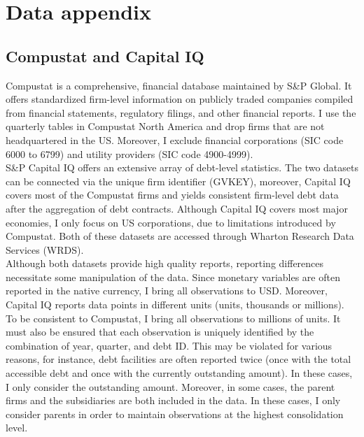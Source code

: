 \documentclass[12pt]{article}
\begin{document}
\section{Data appendix \label{sec:A3}}
\subsection{Compustat and Capital IQ}
Compustat is a comprehensive, financial database maintained by S\&P Global. It offers standardized firm-level information on publicly traded companies compiled from financial statements, regulatory filings, and other financial reports. I use the quarterly tables in Compustat North America and drop firms that are not headquartered in the US. Moreover, I exclude financial corporations (SIC code 6000 to 6799) and utility providers (SIC code 4900-4999). \vspace{3mm} \\
S\&P Capital IQ offers an extensive array of debt-level statistics. The two datasets can be connected via the unique firm identifier (GVKEY), moreover, Capital IQ covers most of the Compustat firms and yields consistent firm-level debt data after the aggregation of debt contracts. Although Capital IQ covers most major economies, I only focus on US corporations, due to limitations introduced by Compustat. Both of these datasets are accessed through Wharton Research Data Services (WRDS). \vspace{3mm} \\
Although both datasets provide high quality reports, reporting differences necessitate some manipulation of the data. Since monetary variables are often reported in the native currency, I bring all observations to USD. Moreover, Capital IQ reports data points in different units (units, thousands or millions). To be consistent to Compustat, I bring all observations to millions of units. It must also be ensured that each observation is uniquely identified by the combination of year, quarter, and debt ID. This may be violated for various reasons, for instance, debt facilities are often reported twice (once with the total accessible debt and once with the currently outstanding amount). In these cases, I only consider the outstanding amount. Moreover, in some cases, the parent firms and the subsidiaries are both included in the data. In these cases, I only consider parents in order to maintain observations at the highest consolidation level. \vspace{3mm} \\
\end{document}
